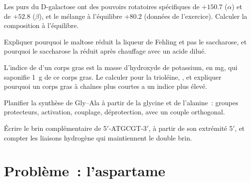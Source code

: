 \begin{exercise}[$\star\star$]\label{exo:b2:biomolecules:8}
Les  purs du D-galactose ont des pouvoirs rotatoires spécifiques de $+150.7$ ($\alpha$) et de
$+52.8$ ($\beta$), et le mélange à l'équilibre $+80.2$ (données de l'exercice). Calculer la composition à l'équilibre.
\end{exercise}

\begin{exercise}[$\star\star$]\label{exo:b2:biomolecules:9}
Expliquer pourquoi le maltose réduit la liqueur de Fehling et pas le saccharose, et pourquoi le
saccharose la réduit après chauffage avec un acide dilué.
\end{exercise}

\begin{exercise}[$\star\star\star$]\label{exo:b2:biomolecules:10}
L'indice de  d'un corps gras est la masse d'hydroxyde de potassium, en mg, qui saponifie
1~g de ce corps gras. Le calculer pour la trioléine, , et expliquer pourquoi un corps gras
à chaînes plus courtes a un indice plus élevé.
\end{exercise}

\begin{exercise}[$\star\star\star$]\label{exo:b2:biomolecules:11}
Planifier la synthèse de Gly--Ala à partir de la glycine et de l'alanine~: groupes protecteurs,
activation, couplage, déprotection, avec un couple orthogonal.
\end{exercise}

\begin{exercise}[$\star\star\star$]\label{exo:b2:biomolecules:12}
Écrire le brin complémentaire de 5$'$-ATGCGT-3$'$, à partir de son extrémité 5$'$, et compter les liaisons
hydrogène qui maintiennent le double brin.
\end{exercise}

\section{Problème~: l'aspartame}

